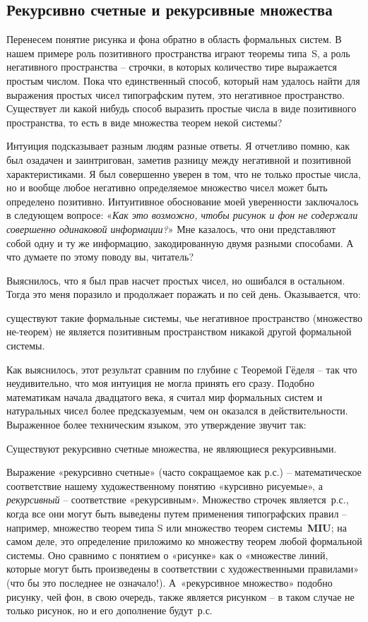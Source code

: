 \documentclass[../main.tex]{subfiles}
\begin{document}
\subsection{Рекурсивно счетные и рекурсивные множества}

Перенесем понятие рисунка и фона обратно в область формальных систем. В нашем примере роль позитивного пространства играют теоремы типа~S, а роль негативного пространства \--- строчки, в которых количество тире выражается простым числом. Пока что единственный способ, который нам удалось найти для выражения простых чисел типографским путем, это негативное пространство. Существует ли какой нибудь способ выразить простые числа в виде позитивного пространства, то есть в виде множества теорем некой системы?

Интуиция подсказывает разным людям разные ответы. Я отчетливо помню, как был озадачен и заинтригован, заметив разницу между негативной и позитивной характеристиками. Я был совершенно уверен в том, что не только простые числа, но и вообще любое негативно определяемое множество чисел может быть определено позитивно. Интуитивное обоснование моей уверенности заключалось в следующем вопросе: «\emph{Как это возможно, чтобы рисунок и фон не содержали совершенно одинаковой информации?}» Мне казалось, что они представляют собой одну и ту же информацию, закодированную двумя разными способами. А что думаете по этому поводу вы, читатель?

Выяснилось, что я был прав насчет простых чисел, но ошибался в остальном. Тогда это меня поразило и продолжает поражать и по сей день. Оказывается, что:
%
\begin{block}
    существуют такие формальные системы, чье негативное пространство (множество не-теорем) не является позитивным пространством никакой другой формальной системы.
\end{block}

Как выяснилось, этот результат сравним по глубине с Теоремой Гёделя \--- так что неудивительно, что моя интуиция не могла принять его сразу. Подобно математикам начала двадцатого века, я считал мир формальных систем и натуральных чисел более предсказуемым, чем он оказался в действительности. Выраженное более техническим языком, это утверждение звучит так:
%
\begin{block}
    Существуют рекурсивно счетные множества, не являющиеся рекурсивными.
\end{block}

Выражение «рекурсивно счетные» (часто сокращаемое как р.с.) \--- математическое соответствие нашему художественному понятию «курсивно рисуемые», а \emph{рекурсивный} \--- соответствие «рекурсивным». Множество строчек является~р.с., когда все они могут быть выведены путем применения типографских правил \--- например, множество теорем типа S или множество теорем системы~\textbf{MIU}; на самом деле, это определение приложимо ко множеству теорем любой формальной системы. Оно сравнимо с понятием о «рисунке» как о «множестве линий, которые могут быть произведены в соответствии с художественными правилами» (что бы это последнее не означало!). А~«рекурсивное множество» подобно рисунку, чей фон, в свою очередь, также является рисунком \--- в таком случае не только рисунок, но и его дополнение будут~р.с.
\end{document}
